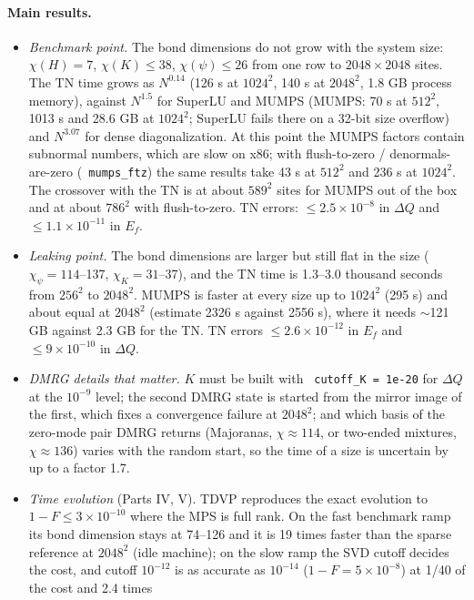 \documentclass[11pt]{article}
\renewcommand{\code}[1]{\texttt{\hyphenchar\font=-1 #1}}
\begin{document}
\paragraph{Main results.}
\begin{itemize}
\item \emph{Benchmark point.} The bond dimensions do not grow with the system size: $\chi(H) = 7$, $\chi(K)\le38$, $\chi(\psi)\le26$ from one row
  to $2048\times2048$ sites. The TN time grows as $N^{0.14}$ (126 s at $1024^2$, 140 s at $2048^2$, 1.8 GB process memory), against
  $N^{1.5}$ for SuperLU and MUMPS (MUMPS: 70 s at $512^2$, 1013 s and 28.6 GB at $1024^2$; SuperLU fails there on a 32-bit size overflow) and $N^{3.07}$ for
  dense diagonalization. At this point the MUMPS factors contain subnormal numbers, which are slow on x86; with flush-to-zero /
  denormals-are-zero (\code{mumps\_ftz}) the same results take 43 s at $512^2$ and 236 s at $1024^2$. The crossover with the TN is at about
  $589^2$ sites for MUMPS out of the box and at about $786^2$ with flush-to-zero. TN errors: $\le2.5\times10^{-8}$ in $\Delta Q$ and $\le1.1\times10^{-11}$ in $E_f$.
\item \emph{Leaking point.} The bond dimensions are larger but still flat in the size ($\chi_\psi = 114$--137, $\chi_K = 31$--37), and the TN
  time is 1.3--3.0 thousand seconds from $256^2$ to $2048^2$. MUMPS is faster at every size up to $1024^2$ (295 s) and about equal at
  $2048^2$ (estimate 2326 s against 2556 s), where it needs $\sim$121 GB against 2.3 GB for the TN. TN errors $\le2.6\times10^{-12}$ in $E_f$ and
  $\le9\times10^{-10}$ in $\Delta Q$.
\item \emph{DMRG details that matter.} $K$ must be built with \code{cutoff\_K = 1e-20} for $\Delta Q$ at the $10^{-9}$ level; the second DMRG state
  is started from the mirror image of the first, which fixes a convergence failure at $2048^2$; and which basis of the zero-mode pair DMRG
  returns (Majoranas, $\chi\approx114$, or two-ended mixtures, $\chi\approx136$) varies with the random start, so the time of a size is uncertain
  by up to a factor 1.7.
\item \emph{Time evolution} (Parts IV, V). TDVP reproduces the exact evolution to $1-F\le3\times10^{-10}$ where the MPS is full rank. On the fast
  benchmark ramp its bond dimension stays at 74--126 and it is 19 times faster than the sparse reference at $2048^2$ (idle machine); on the slow ramp
  the SVD cutoff decides the cost, and cutoff $10^{-12}$ is as accurate as $10^{-14}$ ($1-F = 5\times10^{-8}$) at 1/40 of the cost and 2.4 times

\end{itemize}
\end{document}
